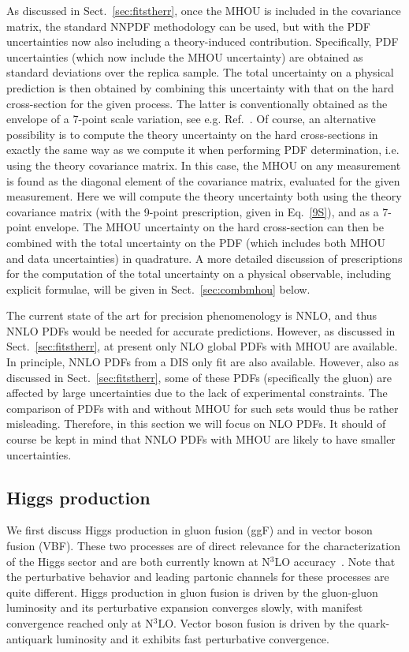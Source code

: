 As discussed in Sect.~\ref{sec:fitstherr}, once the MHOU is included
in the covariance matrix, the standard NNPDF methodology can be used,
but with the PDF uncertainties now also including a theory-induced
contribution. Specifically,
PDF uncertainties (which now include the MHOU uncertainty) are
obtained as standard deviations over the replica sample. The total
uncertainty on a physical prediction is then obtained by combining this
uncertainty with that on the hard cross-section for the given
process. The latter is conventionally obtained as the envelope of a 7-point
scale variation, see e.g. Ref.~\cite{deFlorian:2016spz}. Of course, an
alternative possibility is to compute the theory uncertainty on the
hard cross-sections in exactly the same way as we compute it when
performing PDF determination, i.e. using the theory covariance
matrix. In this case, the MHOU on any measurement is found as the
diagonal element of the covariance matrix, evaluated for the given
measurement. Here we will compute the theory uncertainty both using the theory
covariance matrix (with the 9-point prescription,
given in Eq.~\eqref{9S}), and as a 7-point envelope.
The MHOU uncertainty
on the hard cross-section  can then be combined with the total
uncertainty on the PDF (which includes both MHOU and data
uncertainties) in quadrature. A more detailed discussion of
prescriptions for the computation of the total uncertainty on a
physical observable, including explicit formulae,
will be given in Sect.~\ref{sec:combmhou} below.

The current state of the art for precision phenomenology is NNLO, and
thus NNLO PDFs would be needed for accurate predictions. However, as
discussed in Sect.~\ref{sec:fitstherr}, at present only NLO global PDFs with
MHOU are available. In principle, NNLO PDFs from a DIS only fit are
also available. However, also as discussed in
Sect.~\ref{sec:fitstherr}, some of these PDFs (specifically the gluon)
are affected by large uncertainties due to the lack of
experimental constraints. The comparison of PDFs with and without MHOU
for such sets would thus be rather misleading. Therefore, in this
section we will focus on NLO PDFs. It should of course be kept in mind
that NNLO PDFs with MHOU are likely to have smaller uncertainties.

\subsection{Higgs production}
\label{sec:higgs}

We first discuss Higgs production in gluon 
fusion (ggF) and in vector boson fusion (VBF).
%
These two processes are of direct relevance for the characterization
of the Higgs sector and are both currently 
known at N$^3$LO accuracy~\cite{Anastasiou:2015ema,Anastasiou:2016cez,
Mistlberger:2018etf,Dreyer:2016oyx}.
%
Note that  the perturbative behavior and leading partonic channels
for these processes are quite different. %
Higgs production in gluon fusion is
driven by the gluon-gluon luminosity and its perturbative expansion
converges  slowly, with manifest
convergence reached only at N$^3$LO.
%
Vector boson fusion is driven by the quark-antiquark luminosity and
it exhibits fast perturbative
 convergence.

